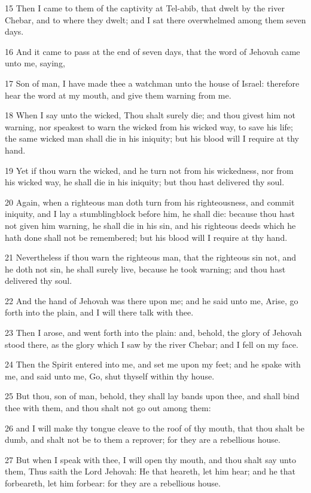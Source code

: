 \par 15 Then I came to them of the captivity at Tel-abib, that dwelt by the river Chebar, and to where they dwelt; and I sat there overwhelmed among them seven days.
\par 16 And it came to pass at the end of seven days, that the word of Jehovah came unto me, saying,
\par 17 Son of man, I have made thee a watchman unto the house of Israel: therefore hear the word at my mouth, and give them warning from me.
\par 18 When I say unto the wicked, Thou shalt surely die; and thou givest him not warning, nor speakest to warn the wicked from his wicked way, to save his life; the same wicked man shall die in his iniquity; but his blood will I require at thy hand.
\par 19 Yet if thou warn the wicked, and he turn not from his wickedness, nor from his wicked way, he shall die in his iniquity; but thou hast delivered thy soul.
\par 20 Again, when a righteous man doth turn from his righteousness, and commit iniquity, and I lay a stumblingblock before him, he shall die: because thou hast not given him warning, he shall die in his sin, and his righteous deeds which he hath done shall not be remembered; but his blood will I require at thy hand.
\par 21 Nevertheless if thou warn the righteous man, that the righteous sin not, and he doth not sin, he shall surely live, because he took warning; and thou hast delivered thy soul.
\par 22 And the hand of Jehovah was there upon me; and he said unto me, Arise, go forth into the plain, and I will there talk with thee.
\par 23 Then I arose, and went forth into the plain: and, behold, the glory of Jehovah stood there, as the glory which I saw by the river Chebar; and I fell on my face.
\par 24 Then the Spirit entered into me, and set me upon my feet; and he spake with me, and said unto me, Go, shut thyself within thy house.
\par 25 But thou, son of man, behold, they shall lay bands upon thee, and shall bind thee with them, and thou shalt not go out among them:
\par 26 and I will make thy tongue cleave to the roof of thy mouth, that thou shalt be dumb, and shalt not be to them a reprover; for they are a rebellious house.
\par 27 But when I speak with thee, I will open thy mouth, and thou shalt say unto them, Thus saith the Lord Jehovah: He that heareth, let him hear; and he that forbeareth, let him forbear: for they are a rebellious house.


